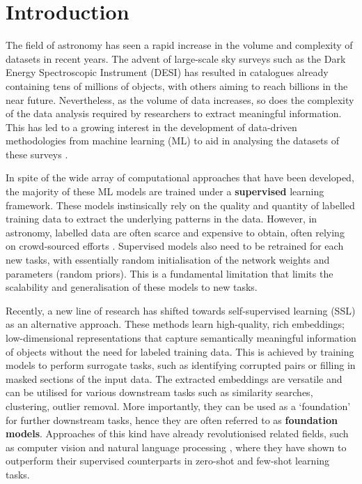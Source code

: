 \documentclass[draft, a4paper,12pt]{article}
\begin{document}
\section{Introduction}


The field of astronomy has seen a rapid increase in the volume and complexity of datasets in recent years. The advent of large-scale sky surveys such as the Dark Energy Spectroscopic Instrument (DESI) \cite{DESI} has resulted in catalogues already containing tens of millions of objects, with others aiming to reach billions in the near future. Nevertheless, as the volume of data increases, so does the complexity of the data analysis required by researchers to extract meaningful information. This has led to a growing interest in the development of data-driven methodologies from machine learning (ML) to aid in analysing the datasets of these surveys \cite{ivezic2020statistics}. 

In spite of the wide array of computational approaches that have been developed, the majority of these ML models are trained under a \textbf{supervised} learning framework. These models instinsically rely on the quality and quantity of labelled training data to extract the underlying patterns in the data. However, in astronomy, labelled data are often scarce and expensive to obtain, often relying on crowd-sourced efforts \cite{willett2013galaxy}. Supervised models also need to be retrained for each new tasks, with essentially random initialisation of the network weights and parameters (random priors). This is a fundamental limitation that limits the scalability and generalisation of these models to new tasks.

Recently, a new line of research has shifted towards self-supervised learning (SSL) as an alternative approach. These methods learn high-quality, rich embeddings; low-dimensional representations that capture semantically meaningful information of objects without the need for labeled training data. This is achieved by training models to perform surrogate tasks, such as identifying corrupted pairs or filling in masked sections of the input data. The extracted embeddings are versatile and can be utilised for various downstream tasks such as similarity searches, clustering, outlier removal. More importantly, they can be used as a `foundation' for further downstream tasks, hence they are often referred to as \textbf{foundation models}.  Approaches of this kind have already revolutionised related fields, such as computer vision \cite{he2021maskedautoencodersscalablevision} and natural language processing \cite{radford2019language}, where they have shown to outperform their supervised counterparts in zero-shot and few-shot learning tasks.
\end{document}
